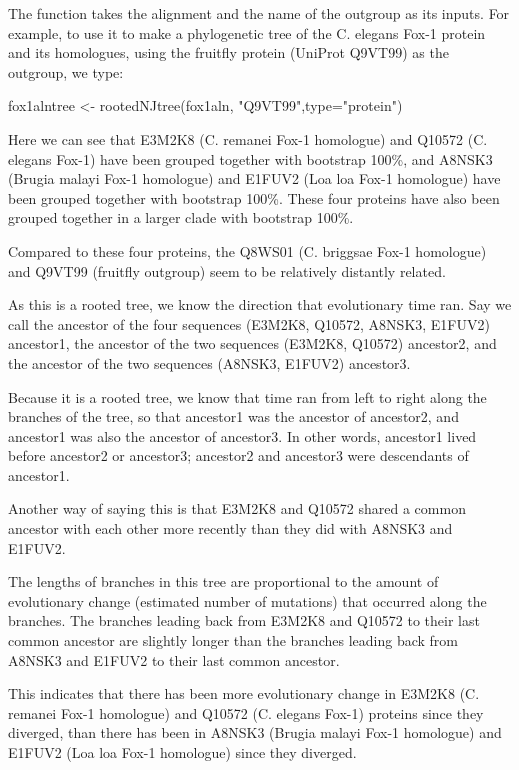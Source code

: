 \documentclass[
]{book}
\newenvironment{Shaded}{\begin{snugshade}}{\end{snugshade}}
\newcommand{\AttributeTok}[1]{\textcolor[rgb]{0.77,0.63,0.00}{#1}}
\newcommand{\FunctionTok}[1]{\textcolor[rgb]{0.00,0.00,0.00}{#1}}
\newcommand{\NormalTok}[1]{#1}
\newcommand{\OtherTok}[1]{\textcolor[rgb]{0.56,0.35,0.01}{#1}}
\newcommand{\StringTok}[1]{\textcolor[rgb]{0.31,0.60,0.02}{#1}}
\begin{document}
The function takes the alignment and the name of the outgroup as its inputs. For example, to use it to make a phylogenetic tree of the C. elegans Fox-1 protein and its homologues, using the fruitfly protein (UniProt Q9VT99) as the outgroup, we type:

\begin{Shaded}
\begin{Highlighting}[]
\NormalTok{fox1alntree }\OtherTok{\textless{}{-}} \FunctionTok{rootedNJtree}\NormalTok{(fox1aln, }\StringTok{"Q9VT99"}\NormalTok{,}\AttributeTok{type=}\StringTok{"protein"}\NormalTok{)}
\end{Highlighting}
\end{Shaded}

Here we can see that E3M2K8 (C. remanei Fox-1 homologue) and Q10572 (C. elegans Fox-1) have been grouped together with bootstrap 100\%, and A8NSK3 (Brugia malayi Fox-1 homologue) and E1FUV2 (Loa loa Fox-1 homologue) have been grouped together with bootstrap 100\%. These four proteins have also been grouped together in a larger clade with bootstrap 100\%.

Compared to these four proteins, the Q8WS01 (C. briggsae Fox-1 homologue) and Q9VT99 (fruitfly outgroup) seem to be relatively distantly related.

As this is a rooted tree, we know the direction that evolutionary time ran. Say we call the ancestor of the four sequences (E3M2K8, Q10572, A8NSK3, E1FUV2) ancestor1, the ancestor of the two sequences (E3M2K8, Q10572) ancestor2, and the ancestor of the two sequences (A8NSK3, E1FUV2) ancestor3.

Because it is a rooted tree, we know that time ran from left to right along the branches of the tree, so that ancestor1 was the ancestor of ancestor2, and ancestor1 was also the ancestor of ancestor3. In other words, ancestor1 lived before ancestor2 or ancestor3; ancestor2 and ancestor3 were descendants of ancestor1.

Another way of saying this is that E3M2K8 and Q10572 shared a common ancestor with each other more recently than they did with A8NSK3 and E1FUV2.

The lengths of branches in this tree are proportional to the amount of evolutionary change (estimated number of mutations) that occurred along the branches. The branches leading back from E3M2K8 and Q10572 to their last common ancestor are slightly longer than the branches leading back from A8NSK3 and E1FUV2 to their last common ancestor.

This indicates that there has been more evolutionary change in E3M2K8 (C. remanei Fox-1 homologue) and Q10572 (C. elegans Fox-1) proteins since they diverged, than there has been in A8NSK3 (Brugia malayi Fox-1 homologue) and E1FUV2 (Loa loa Fox-1 homologue) since they diverged.
\end{document}
